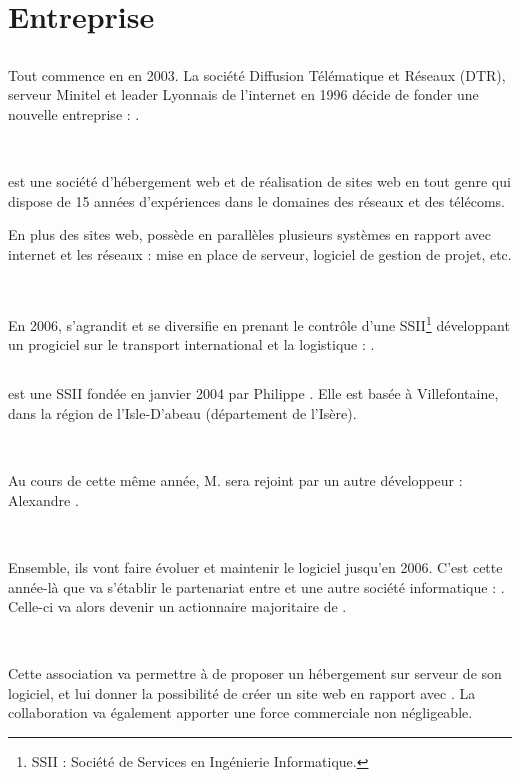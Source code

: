 \chapter{Entreprise}
\section{\fidit}
Tout commence en en 2003. La société Diffusion Télématique et Réseaux (DTR), serveur Minitel et leader Lyonnais de l'internet en 1996 décide de fonder une nouvelle entreprise : \fidit{}.

~

\fidit{} est une société d'hébergement web et de réalisation de sites web en tout genre qui dispose de 15 années d'expériences dans le domaines des réseaux et des télécoms.

En plus des sites web, \fidit{} possède en parallèles plusieurs systèmes en rapport avec internet et les réseaux : mise en place de serveur, logiciel de gestion de projet, etc.

~

En 2006, \fidit{} s'agrandit et se diversifie en prenant le contrôle d'une SSII\footnote{SSII : Société de Services en Ingénierie Informatique.} développant un progiciel sur le transport international et la logistique : \solulog.

\section{\solulog}
\solulog{} est une SSII fondée en janvier 2004 par Philippe . Elle est basée à Villefontaine, dans la région de l'Isle-D'abeau (département de l'Isère).

~

Au cours de cette même année, M.  sera rejoint par un autre développeur : Alexandre .

~

Ensemble, ils vont faire évoluer et maintenir le logiciel \integrale{} jusqu'en 2006. C'est cette année-là que va s'établir le partenariat entre \solulog{} et une autre société informatique : \fidit. Celle-ci va alors devenir un actionnaire majoritaire de \solulog.

~

Cette association va permettre à \solulog{} de proposer un hébergement sur serveur de son logiciel, et lui donner la possibilité de créer un site web en rapport avec \integrale. La collaboration va également apporter une force commerciale non négligeable.

